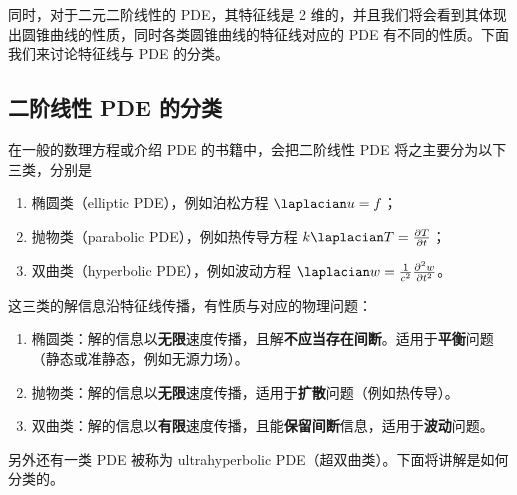 同时，对于二元二阶线性的 PDE，其特征线是 2 维的，并且我们将会看到其体现出圆锥曲线的性质，同时各类圆锥曲线的特征线对应的 PDE 有不同的性质。下面我们来讨论特征线与 PDE 的分类。

\subsection{二阶线性 PDE 的分类}\label{sub_chacur_1}
在一般的数理方程或介绍 PDE 的书籍中，会把二阶线性 PDE 将之主要分为以下三类，分别是
\begin{enumerate}
\item 椭圆类（elliptic PDE），例如泊松方程 $\laplacian u = f$；
\item 抛物类（parabolic PDE），例如热传导方程 $k \laplacian T = \frac{\partial T}{\partial t}$；
\item 双曲类（hyperbolic PDE），例如波动方程 $\laplacian w = \frac{1}{c^2} \frac{\partial^2 w}{\partial t^2}$。
\end{enumerate}
这三类的解信息沿特征线传播，有性质与对应的物理问题：
\begin{enumerate}
\item 椭圆类：解的信息以\textbf{无限}速度传播，且解\textbf{不应当存在间断}。适用于\textbf{平衡}问题（静态或准静态，例如无源力场）。
\item 抛物类：解的信息以\textbf{无限}速度传播，适用于\textbf{扩散}问题（例如热传导）。
\item 双曲类：解的信息以\textbf{有限}速度传播，且能\textbf{保留间断}信息，适用于\textbf{波动}问题。
\end{enumerate}
另外还有一类 PDE 被称为 ultrahyperbolic PDE（超双曲类）。下面将讲解是如何分类的。

